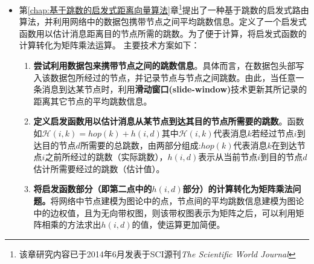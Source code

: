 \begin{itemize}
\item 第\ref{chap:基于跳数的启发式距离向量算法}章\footnote{该章研究内容已于2014年6月发表于SCI源刊\textit{The Scientific World Journal}}提出了一种基于跳数的启发式路由算法，并利用网络中的数据包携带节点之间平均跳数信息。定义了一个启发式函数用以估计消息距离目的节点所需的跳数。为了便于计算，将启发式函数的计算转化为矩阵乘法运算。
主要技术方案如下：
\begin{enumerate}
\item \textbf{尝试利用数据包来携带节点之间的跳数信息}。具体而言，在数据包头部写入该数据包所经过的节点，并记录节点与节点之间跳数。由此，当任意一条消息到达某节点时，利用\textbf{滑动窗口(slide-window)}技术更新其所记录的距离其它节点的平均跳数信息。

\item \textbf{定义启发函数用以估计消息从某节点到达其目的节点所需要的跳数}。函数如$
\label{eq:Hh}
\mathcal{H}(i,k) = hop(k) + h(i, d)
$其中$\mathcal{H}(i,k)$代表消息$k$若经过节点$i$到达目的节点$d$所需要的总跳数，由两部分组成:$hop(k)$代表消息$k$在到达节点$i$之前所经过的跳数（实际跳数），$h(i,d)$表示从当前节点$i$到目的节点$d$估计所需要经过的跳数（估计值）。

\item \textbf{将启发函数部分（即第二点中的$h(i,d)$部分）的计算转化为矩阵乘法问题。}将网络中节点建模为图论中的点，节点间的平均跳数信息建模为图论中的边权值，且为无向带权图，则该带权图表示为矩阵之后，可以利用矩阵相乘的方法求出$h(i,d)$的值，使运算更加简便。
\end{enumerate}
\end{itemize}